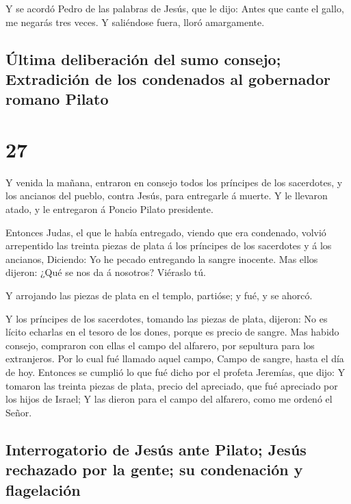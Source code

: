  Y se acordó Pedro de las palabras de Jesús, que le dijo:
Antes que cante el gallo, me negarás tres veces. Y saliéndose fuera,
lloró amargamente.

\hypertarget{uxfaltima-deliberaciuxf3n-del-sumo-consejo-extradiciuxf3n-de-los-condenados-al-gobernador-romano-pilato}{%
\subsection{Última deliberación del sumo consejo; Extradición de los
condenados al gobernador romano
Pilato}\label{uxfaltima-deliberaciuxf3n-del-sumo-consejo-extradiciuxf3n-de-los-condenados-al-gobernador-romano-pilato}}

\hypertarget{section-26}{%
\section{27}\label{section-26}}

 Y venida la mañana, entraron en consejo todos los príncipes
de los sacerdotes, y los ancianos del pueblo, contra Jesús, para
entregarle á muerte.  Y le llevaron atado, y le entregaron á
Poncio Pilato presidente.

 Entonces Judas, el que le había entregado, viendo que era
condenado, volvió arrepentido las treinta piezas de plata á los
príncipes de los sacerdotes y á los ancianos,  Diciendo: Yo
he pecado entregando la sangre inocente. Mas ellos dijeron: ¿Qué se nos
da á nosotros? Viéraslo tú.

 Y arrojando las piezas de plata en el templo, partióse; y
fué, y se ahorcó.

 Y los príncipes de los sacerdotes, tomando las piezas de
plata, dijeron: No es lícito echarlas en el tesoro de los dones, porque
es precio de sangre.  Mas habido consejo, compraron con
ellas el campo del alfarero, por sepultura para los extranjeros.
 Por lo cual fué llamado aquel campo, Campo de sangre, hasta
el día de hoy.  Entonces se cumplió lo que fué dicho por el
profeta Jeremías, que dijo: Y tomaron las treinta piezas de plata,
precio del apreciado, que fué apreciado por los hijos de Israel;
 Y las dieron para el campo del alfarero, como me ordenó el
Señor.

\hypertarget{interrogatorio-de-jesuxfas-ante-pilato-jesuxfas-rechazado-por-la-gente-su-condenaciuxf3n-y-flagelaciuxf3n}{%
\subsection{Interrogatorio de Jesús ante Pilato; Jesús rechazado por la
gente; su condenación y
flagelación}\label{interrogatorio-de-jesuxfas-ante-pilato-jesuxfas-rechazado-por-la-gente-su-condenaciuxf3n-y-flagelaciuxf3n}}


